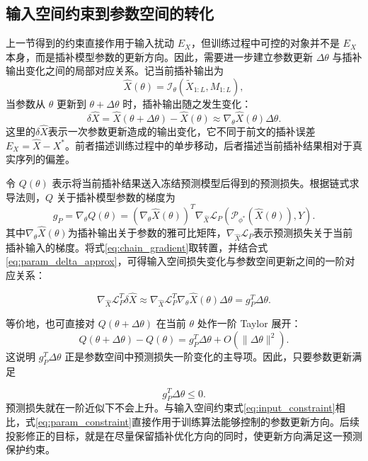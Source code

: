 \documentclass{article}
\begin{document}
\subsection{输入空间约束到参数空间的转化}

上一节得到的约束直接作用于输入扰动 $E_X$，但训练过程中可控的对象并不是 $E_X$ 本身，而是插补模型参数的更新方向。因此，需要进一步建立参数更新 $\Delta\theta$ 与插补输出变化之间的局部对应关系。记当前插补输出为
\[
	\hat{X}(\theta)=\mathcal{I}_{\theta}(\tilde{X}_{1:L}, M_{1:L}),
\]
当参数从 $\theta$ 更新到 $\theta+\Delta\theta$ 时，插补输出随之发生变化：
\begin{equation}\label{eq:param_delta_approx}
	\delta\hat{X}=\hat{X}(\theta+\Delta\theta)-\hat{X}(\theta)\approx\nabla_\theta\hat{X}(\theta)\Delta\theta.
\end{equation}
这里的$\delta\hat{X}$表示一次参数更新造成的输出变化，它不同于前文的插补误差$E_X=\hat{X}-X^\ast$。前者描述训练过程中的单步移动，后者描述当前插补结果相对于真实序列的偏差。

令 $Q(\theta)$ 表示将当前插补结果送入冻结预测模型后得到的预测损失。根据链式求导法则，$Q$ 关于插补模型参数的梯度为
\begin{equation}\label{eq:chain_gradient}
	g_P=\nabla_\theta Q(\theta) = (\nabla_\theta\hat{X}(\theta))^T\nabla_{\hat{X}}\mathcal{L}_P(\mathcal{P}_{\phi^\ast}(\hat{X}(\theta)),Y).
\end{equation}
其中$\nabla_\theta\hat{X}(\theta)$为插补输出关于参数的雅可比矩阵，$\nabla_{\hat{X}}\mathcal{L}_P$表示预测损失关于当前插补输入的梯度。将式\ref{eq:chain_gradient}取转置，并结合式\ref{eq:param_delta_approx}，可得输入空间损失变化与参数空间更新之间的一阶对应关系：

\begin{equation}\label{eq:param_input_bridge}
	\nabla_{\hat{X}}\mathcal{L}_P^T\delta\hat{X}
	\approx
	\nabla_{\hat{X}}\mathcal{L}_P^T\nabla_\theta\hat{X}(\theta)\Delta\theta
	= g_P^T\Delta\theta.
\end{equation}

等价地，也可直接对 $Q(\theta+\Delta\theta)$ 在当前 $\theta$ 处作一阶 Taylor 展开：
\begin{equation}
	Q(\theta+\Delta\theta)-Q(\theta)=g_P^T\Delta\theta+O(\|\Delta\theta\|^2).
\end{equation}
这说明 $g_P^T\Delta\theta$ 正是参数空间中预测损失一阶变化的主导项。因此，只要参数更新满足

\begin{equation}\label{eq:param_constraint}
	g_P^T\Delta\theta\leq 0.
\end{equation}
预测损失就在一阶近似下不会上升。与输入空间约束式\ref{eq:input_constraint}相比，式\ref{eq:param_constraint}直接作用于训练算法能够控制的参数更新方向。后续投影修正的目标，就是在尽量保留插补优化方向的同时，使更新方向满足这一预测保护约束。
\end{document}
